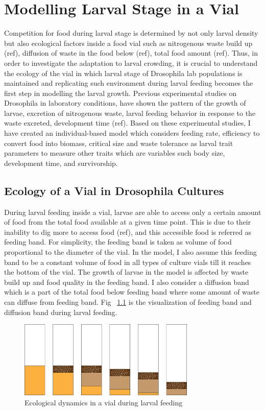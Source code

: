 \chapter{Modelling Larval Stage in a Vial}
 Competition for food during larval stage is determined by not only larval density but also ecological factors inside a food vial such as nitrogenous waste build up (ref), diffusion of waste in the food below (ref), total food amount (ref). Thus, in order to investigate the adaptation to larval crowding, it is crucial to understand the ecology of the vial in which larval stage of Drosophila lab populations is maintained and replicating such environment during larval feeding becomes the first step in modelling the larval growth. Previous experimental studies on Drosophila in laboratory conditions, have shown the pattern of the growth of larvae, excretion of nitrogenous waste, larval feeding behavior in response to the waste excreted, development time (ref). Based on these experimental studies, I have created an individual-based model which considers feeding rate, efficiency to convert food into biomass, critical size and waste tolerance as larval trait parameters to measure other traits which are variables such body size, development time, and survivorship.
\section{Ecology of a Vial in Drosophila Cultures}
During larval feeding inside a vial, larvae are able to access only a certain amount of food from the total food available at a given time point. This is due to their inability to dig more to access food (ref), and this accessible food is referred as feeding band. For simplicity, the feeding band is taken as volume of food proportional to the diameter of the vial. In the model, I also assume this feeding band to be a constant volume of food in all types of culture vials till it reaches the bottom of the vial. The growth of larvae in the model is affected by waste build up and food quality in the feeding band. I also consider a diffusion band which is a part of the total food below feeding band where some amount of waste can diffuse from feeding band. Fig ~\ref{fig:vial} is the visualization of feeding band and diffusion band during larval feeding.

\begin{figure}[h]
  \centering
  \includegraphics[width=0.75\textwidth]{C2/Figs/vial_diagram}
  \caption{Ecological dynamics in a vial during larval feeding}
  \label{fig:vial}
\end{figure}


